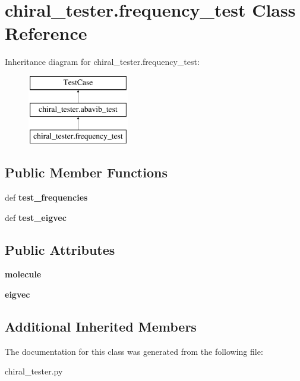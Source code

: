 \hypertarget{classchiral__tester_1_1frequency__test}{\section{chiral\+\_\+tester.\+frequency\+\_\+test Class Reference}
\label{classchiral__tester_1_1frequency__test}
}
Inheritance diagram for chiral\+\_\+tester.\+frequency\+\_\+test\+:\begin{figure}[H]
\begin{center}
\leavevmode
\includegraphics[height=3.000000cm]{classchiral__tester_1_1frequency__test}
\end{center}
\end{figure}
\subsection*{Public Member Functions}
\begin{DoxyCompactItemize}
\item 
\hypertarget{classchiral__tester_1_1frequency__test_a9be6690b1abb3f183b82427b62c90fdd}{def {\bfseries test\+\_\+frequencies}}\label{classchiral__tester_1_1frequency__test_a9be6690b1abb3f183b82427b62c90fdd}

\item 
\hypertarget{classchiral__tester_1_1frequency__test_a6165a8c07f6c474b0a964bfc65209300}{def {\bfseries test\+\_\+eigvec}}\label{classchiral__tester_1_1frequency__test_a6165a8c07f6c474b0a964bfc65209300}

\end{DoxyCompactItemize}
\subsection*{Public Attributes}
\begin{DoxyCompactItemize}
\item 
\hypertarget{classchiral__tester_1_1frequency__test_a9da6c7e36728ca8a521776da8a823cd8}{{\bfseries molecule}}\label{classchiral__tester_1_1frequency__test_a9da6c7e36728ca8a521776da8a823cd8}

\item 
\hypertarget{classchiral__tester_1_1frequency__test_aacc963809144e88a62e50ef9273704df}{{\bfseries eigvec}}\label{classchiral__tester_1_1frequency__test_aacc963809144e88a62e50ef9273704df}

\end{DoxyCompactItemize}
\subsection*{Additional Inherited Members}


The documentation for this class was generated from the following file\+:\begin{DoxyCompactItemize}
\item 
chiral\+\_\+tester.\+py\end{DoxyCompactItemize}
